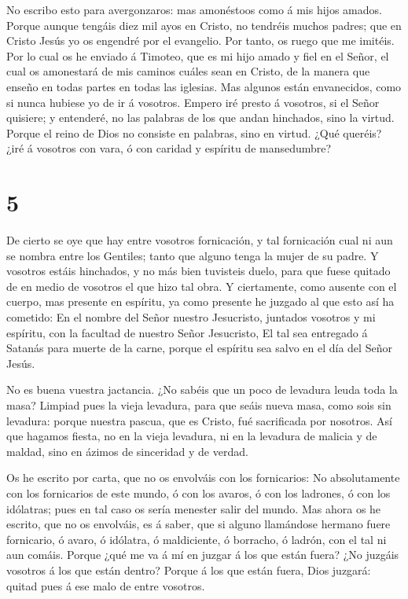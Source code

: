  No escribo esto para avergonzaros: mas amonéstoos como á
mis hijos amados.  Porque aunque tengáis diez mil ayos en
Cristo, no tendréis muchos padres; que en Cristo Jesús yo os engendré
por el evangelio.  Por tanto, os ruego que me imitéis.
 Por lo cual os he enviado á Timoteo, que es mi hijo amado
y fiel en el Señor, el cual os amonestará de mis caminos cuáles sean en
Cristo, de la manera que enseño en todas partes en todas las iglesias.
 Mas algunos están envanecidos, como si nunca hubiese yo de
ir á vosotros.  Empero iré presto á vosotros, si el Señor
quisiere; y entenderé, no las palabras de los que andan hinchados, sino
la virtud.  Porque el reino de Dios no consiste en
palabras, sino en virtud.  ¿Qué queréis? ¿iré á vosotros
con vara, ó con caridad y espíritu de mansedumbre?

\hypertarget{section-4}{%
\section{5}\label{section-4}}

 De cierto se oye que hay entre vosotros fornicación, y tal
fornicación cual ni aun se nombra entre los Gentiles; tanto que alguno
tenga la mujer de su padre.  Y vosotros estáis hinchados, y
no más bien tuvisteis duelo, para que fuese quitado de en medio de
vosotros el que hizo tal obra.  Y ciertamente, como ausente
con el cuerpo, mas presente en espíritu, ya como presente he juzgado al
que esto así ha cometido:  En el nombre del Señor nuestro
Jesucristo, juntados vosotros y mi espíritu, con la facultad de nuestro
Señor Jesucristo,  El tal sea entregado á Satanás para
muerte de la carne, porque el espíritu sea salvo en el día del Señor
Jesús.

 No es buena vuestra jactancia. ¿No sabéis que un poco de
levadura leuda toda la masa?  Limpiad pues la vieja
levadura, para que seáis nueva masa, como sois sin levadura: porque
nuestra pascua, que es Cristo, fué sacrificada por nosotros.
 Así que hagamos fiesta, no en la vieja levadura, ni en la
levadura de malicia y de maldad, sino en ázimos de sinceridad y de
verdad.

 Os he escrito por carta, que no os envolváis con los
fornicarios:  No absolutamente con los fornicarios de este
mundo, ó con los avaros, ó con los ladrones, ó con los idólatras; pues
en tal caso os sería menester salir del mundo.  Mas ahora
os he escrito, que no os envolváis, es á saber, que si alguno llamándose
hermano fuere fornicario, ó avaro, ó idólatra, ó maldiciente, ó
borracho, ó ladrón, con el tal ni aun comáis.  Porque ¿qué
me va á mí en juzgar á los que están fuera? ¿No juzgáis vosotros á los
que están dentro?  Porque á los que están fuera, Dios
juzgará: quitad pues á ese malo de entre vosotros.

